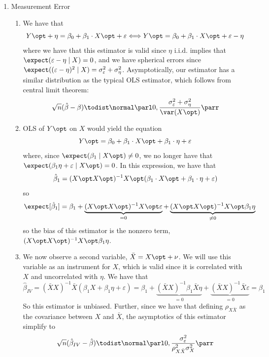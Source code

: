 \documentclass[10pt]{article}
\begin{document}
\begin{enumerate}
	\item Measurement Error \begin{enumerate} \item We have that \[Y\opt + \eta = \beta_0 + \beta_1\cdot X\opt + \varepsilon \Longleftrightarrow Y\opt = \beta_0 + \beta_1\cdot X\opt + \varepsilon -\eta\]where we have that this estimator is valid since $\eta$ i.i.d. implies that $\expect(\varepsilon - \eta \mid X) = 0$, and we have spherical errors since $\expect ((\varepsilon - \eta)^2 \mid X) = \sigma_\varepsilon^2 + \sigma_\eta^2$. Asymptotically, our estimator has a similar distribution as the typical OLS estimator, which follows from central limit theorem: \[\sqrt{n}(\hat{\beta}-\beta) \todist \normal\parl 0 , \frac{\sigma_\varepsilon^2+\sigma_\eta^2}{\var(X\opt)}\parr\] \item OLS of $Y\opt$ on $X$ would yield the equation \[Y\opt = \beta_0 + \beta_1\cdot X\opt + \beta_1 \cdot \eta +\varepsilon\]where, since $\expect(\beta_1 \mid X\opt) \ne 0$, we no longer have that $\expect(\beta_1 \eta + \varepsilon \mid X\opt) = 0$. In this expression, we have that \[\hat{\beta}_1 = (X\opt X\opt)^{-1} X\opt  (\beta_1\cdot X\opt + \beta_1 \cdot \eta +\varepsilon)\]so \[\expect[\hat{\beta}_1] = \beta_1 + \underbrace{ (X\opt X\opt)^{-1}X\opt\varepsilon}_{=0} + \underbrace{ (X\opt X\opt)^{-1}X\opt \beta_1 \eta}_{\ne 0}\] so the bias of this estimator is the nonzero term, $ (X\opt X\opt)^{-1}X\opt \beta_1 \eta$. \item We now observe a second variable, $\bar{X} = X\opt + \nu$. We will use this variable as an instrument for $X$, which is valid since it is correlated with $X$ and uncorrelated with $\eta$. We have that \[\hat{\beta}_{IV} = (\bar{X}X)^{-1} \bar{X}(\beta_1 X +\beta_1\eta + \varepsilon) = \beta_1 + \underbrace{(\bar{X}X)^{-1}\beta_1\bar{X}\eta}_{=0} + \underbrace{(\bar{X}X)^{-1}\bar{X}\varepsilon}_{=0} = \beta_1\]So this estimator is unbiased. Further, since we have that defining $\rho_{X\bar{X}}$ as the covariance between $X$ and $\bar{X}$, the asymptotics of this estimator simplify to\[\sqrt{n}(\hat{\beta}_{IV} - \hat{\beta}) \todist \normal \parl 0 , \frac{\sigma_\varepsilon^2}{\rho_{X\bar{X}}^2 \sigma_X^2}\parr\] \end{enumerate}

\end{enumerate}
\end{document}
